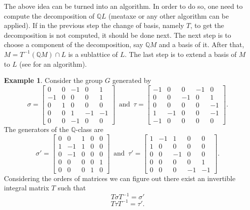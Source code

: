 \documentclass[12pt]{article}
\theoremstyle{plain}
\theoremstyle{definition}
\newtheorem{example}[theorem]{Example}
\newcommand{\Q}{\ensuremath{\mathbb{Q}}}
\newcommand{\tand}{\ensuremath{\,\,\, \text{and} \,\,\,}}
\begin{document}
The above idea can be turned into an algorithm. In order to do so, one need to compute the decomposition of $\Q L$ (meataxe or any other algorithm can be applied). If in the previous step the change of basis, namely $T$, to get the decomposition is not computed, it should be done next. The next step is to choose a component of the decomposition, say $\Q M$ and a basis of it. After that, $M = T^{-1}(\Q M) \cap L$ is a sublattice of $L$. The last step is to extend a basis of $M$ to $L$ (see \cite{LatticeBase} for an algorithm).
\begin{example}\label{exmp:Decompose}
Consider the group $G$ generated by 
$$
\sigma = \left[\begin{array}{rrrrr}
0 & 0 & -1 & 0 & 1 \\
-1 & 0 & 0 & 0 & 1 \\
0 & 1 & 0 & 0 & 0 \\
0 & 0 & 1 & -1 & -1 \\
0 & 0 & -1 & 0 & 0
\end{array}\right]
 \tand
\tau = \left[\begin{array}{rrrrr}
-1 & 0 & 0 & -1 & 0 \\
0 & 0 & -1 & 0 & 1 \\
0 & 0 & 0 & 0 & -1 \\
1 & -1 & 0 & 0 & -1 \\
-1 & 0 & 0 & 0 & 0
\end{array}\right].
$$
The generators of the $\Q$-class are
$$
\sigma' =\left[\begin{array}{rrr|rr}
0 & 0 & 1 & 0 & 0 \\
1 & -1 & 1 & 0 & 0 \\
0 & -1 & 0 & 0 & 0 \\
\hline
0 & 0 & 0 & 0 & 1 \\
0 & 0 & 0 & 1 & 0
\end{array}\right]
 \tand
\tau' = \left[\begin{array}{rrr|rr}
1 & -1 & 1 & 0 & 0 \\
1 & 0 & 0 & 0 & 0 \\
0 & 0 & -1 & 0 & 0 \\
\hline
0 & 0 & 0 & 0 & 1 \\
0 & 0 & 0 & -1 & -1
\end{array}\right].
$$
Considering the orders of matrices we can figure out there exist an invertible integral matrix $T$ such that 
$$T\sigma T^{-1}= \sigma'$$
$$T\tau T^{-1} = \tau'.$$

\end{example}
\end{document}
